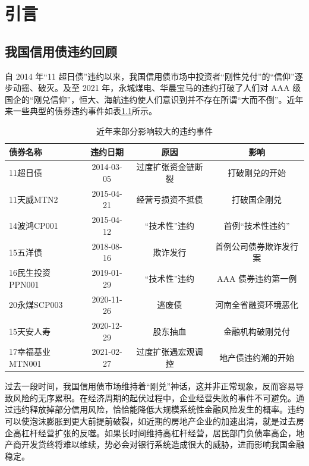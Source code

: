 
\chapter{引言}

\section{我国信用债违约回顾}

自 2014 年“11 超日债”违约以来，我国信用债市场中投资者“刚性兑付”的“信仰”逐步动摇、破灭。及至 2021 年，永城煤电、华晨宝马的违约打破了人们对 AAA 级国企的“刚兑信仰”，恒大、海航违约使人们意识到并不存在所谓“大而不倒”。近年来一些典型的债券违约事件如表\ref{tab:defaults_in_history}所示。

\begin{table}[h]
	\caption{近年来部分影响较大的违约事件}
	\centering
	\begin{tabular}{lccc}
		债券名称         & 违约日期   & 原因               & 影响                   \\ \hline
		11超日债         & 2014-03-05 & 过度扩张资金链断裂 & 打破刚兑的开始         \\
		11天威MTN2       & 2015-04-21 & 经营亏损资不抵债   & 打破国企刚兑           \\
		14波鸿CP001      & 2015-04-12 & “技术性”违约       & 首例“技术性违约”       \\
		15五洋债         & 2018-08-16 & 欺诈发行           & 首例公司债券欺诈发行案 \\
		16民生投资PPN001 & 2019-01-29 & “技术性”违约       & AAA 债券违约第一例     \\
		20永煤SCP003     & 2020-11-26 & 逃废债             & 河南全省融资环境恶化   \\
		15天安人寿       & 2020-12-29 & 股东抽血           & 金融机构破刚兑付       \\
		17幸福基业MTN001 & 2021-02-27 & 过度扩张遇宏观调控 & 地产债违约潮的开始     \\
	\end{tabular}
	\label{tab:defaults_in_history}
\end{table}

过去一段时间，我国信用债市场维持着“刚兑”神话，这并非正常现象，反而容易导致风险的无序累积。在经济周期的起伏过程中，企业经营失败的事件不可避免。通过违约释放掉部分信用风险，恰恰能降低大规模系统性金融风险发生的概率。违约可以使泡沫膨胀到更大前提前破裂，如近期的房地产企业的加速出清，就是过去房企高杠杆经营扩张的反噬。如果长时间维持高杠杆经营，居民部门负债率高企，地产商开发贷终将难以维续，势必会对银行系统造成很大的威胁，进而影响我国金融稳定。


